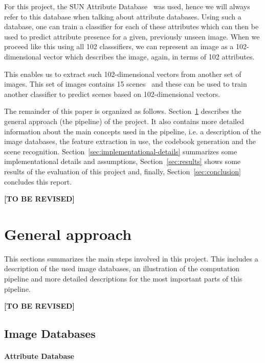 \documentclass{vldb}
\newcommand{\tbr}{{\color{red}\textbf{[TO BE REVISED]}}}
\begin{document}
For this project, the SUN Attribute Database~\cite{Patterson:2012} was used, hence
we will always refer to this database when talking about attribute databases.
Using such a database, one can train a classifier for each of these attributes
which can then be used to predict attribute presence for a given, previously
unseen image. When we proceed like this using all 102 classsifiers, we can
represent an image as a 102-dimensional vector which describes the image, again,
in terms of 102 attributes.

This enables us to extract such 102-dimensional vectors from another set of
images. This set of images contains 15 scenes~\cite{Lazebnik:2006} and these can
be used to train another classifier to predict scenes based on 102-dimensional
vectors.

The remainder of this paper is organized as follows.
Section~\ref{sec:general-approach} describes the general approach (the pipeline)
of the project. It also contains more detailed information about the main
concepts used in the pipeline, i.e. a description of the image databases, the
feature extraction in use, the codebook generation and the scene recognition.
Section~\ref{sec:implementational-details} summarizes some implementational
details and assumptions, Section~\ref{sec:results} shows some results of the
evaluation of this project and, finally, Section~\ref{sec:conclusion} concludes
this report.

\tbr


\section{General approach}
\label{sec:general-approach}

This sections summarizes the main steps involved in this project. This includes
a description of the used image databases, an illustration of the computation
pipeline and more detailed descriptions for the most important parts of this
pipeline.

\tbr

\subsection{Image Databases}
\label{subsec:image-databases}

\paragraph*{Attribute Database}
\label{par:attribute-database}
\end{document}
